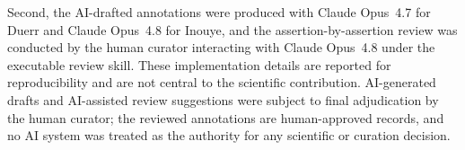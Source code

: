 Second, the AI-drafted annotations were produced with Claude Opus~4.7 for
Duerr and Claude Opus~4.8 for Inouye, and the assertion-by-assertion review
was conducted by the human curator interacting with Claude Opus~4.8 under
the executable review skill. These implementation details are reported for
reproducibility and are not central to the scientific contribution.
AI-generated drafts and AI-assisted review suggestions were subject to
final adjudication by the human curator; the reviewed annotations are
human-approved records, and no AI system was treated as the authority for
any scientific or curation decision.
